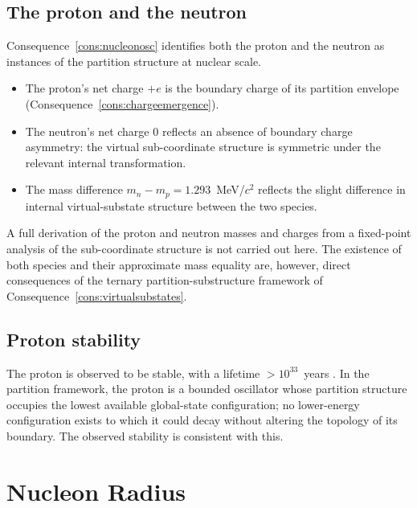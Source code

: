 \subsection{The proton and the neutron}
\label{subsec:proton-neutron}

Consequence~\ref{cons:nucleonosc} identifies both the proton and the neutron
as instances of the partition structure at nuclear scale.

\begin{itemize}
\item The proton's net charge $+e$ is the boundary charge of its partition
  envelope (Consequence~\ref{cons:chargeemergence}).
\item The neutron's net charge $0$ reflects an absence of boundary charge
  asymmetry: the virtual sub-coordinate structure is symmetric under the
  relevant internal transformation.
\item The mass difference $m_{n}-m_{p}=1.293$~MeV/$c^{2}$ reflects the
  slight difference in internal virtual-substate structure between the two
  species.
\end{itemize}

A full derivation of the proton and neutron masses and charges from a
fixed-point analysis of the sub-coordinate structure is not carried out here.
The existence of both species and their approximate mass equality are,
however, direct consequences of the ternary partition-substructure framework
of Consequence~\ref{cons:virtualsubstates}.

\subsection{Proton stability}
\label{subsec:protonstability}

The proton is observed to be stable, with a lifetime $>10^{33}$~years
\citep{codata2018}.  In the partition framework, the proton is a bounded
oscillator whose partition structure occupies the lowest available global-state
configuration; no lower-energy configuration exists to which it could decay
without altering the topology of its boundary.  The observed stability is
consistent with this.

\section{Nucleon Radius}
\label{sec:nucleonradius}

